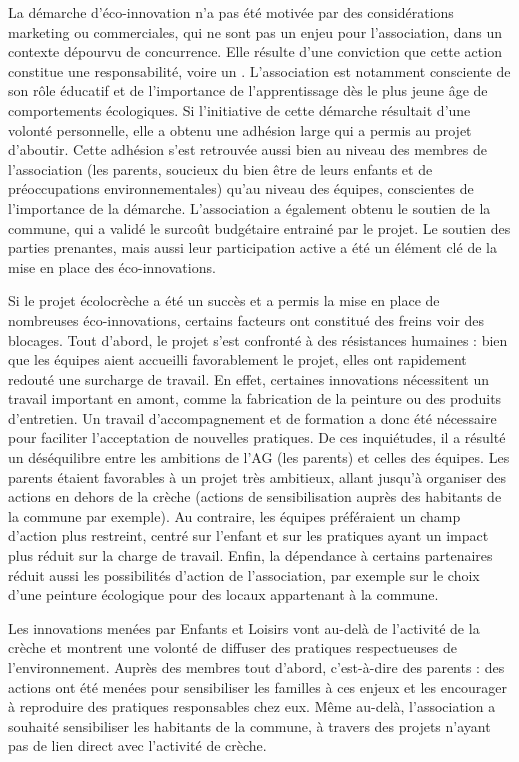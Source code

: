        La démarche d’éco-innovation n’a pas été motivée par des considérations marketing ou commerciales, qui ne sont pas un enjeu pour l’association, dans un contexte dépourvu de concurrence. Elle résulte d’une conviction que cette action constitue une responsabilité, voire un . L’association est notamment consciente de son rôle éducatif et de l’importance de l’apprentissage dès le plus jeune âge de comportements écologiques. Si l’initiative de cette démarche résultait d’une volonté personnelle, elle a obtenu une adhésion large qui a permis au projet d’aboutir. Cette adhésion s’est retrouvée aussi bien au niveau des membres de l’association (les parents, soucieux du bien être de leurs enfants et de préoccupations environnementales) qu’au niveau des équipes, conscientes de l’importance de la démarche. L’association a également obtenu le soutien de la commune, qui a validé le surcoût budgétaire entrainé par le projet. Le soutien des parties prenantes, mais aussi leur participation active a été un élément clé de la mise en place des éco-innovations.

         Si le projet écolocrèche a été un succès et a permis la mise en place de nombreuses éco-innovations, certains facteurs ont constitué des freins voir des blocages. Tout d’abord, le projet s’est confronté à des résistances humaines : bien que les équipes aient accueilli favorablement le projet, elles ont rapidement redouté une surcharge de travail. En effet, certaines innovations nécessitent un travail important en amont, comme la fabrication de la peinture ou des produits d’entretien. Un travail d’accompagnement et de formation a donc été nécessaire pour faciliter l’acceptation de nouvelles pratiques.  De ces inquiétudes, il a résulté un déséquilibre entre les ambitions de l’AG (les parents) et celles des équipes. Les parents étaient favorables à un projet très ambitieux, allant jusqu’à organiser des actions en dehors de la crèche (actions de sensibilisation auprès des habitants de la commune par exemple). Au contraire, les équipes préféraient un champ d’action plus restreint, centré sur l’enfant et sur les pratiques ayant un impact plus réduit sur la charge de travail. Enfin, la dépendance à certains partenaires réduit aussi les possibilités d’action de l’association, par exemple sur le choix d’une peinture écologique pour des locaux appartenant à la commune.

        Les innovations menées par Enfants et Loisirs vont au-delà de l’activité de la crèche et montrent une volonté de diffuser des pratiques respectueuses de l’environnement. Auprès des membres tout d’abord, c'est-à-dire des parents : des actions ont été menées pour sensibiliser les familles à ces enjeux et les encourager à reproduire des pratiques responsables chez eux. Même au-delà, l’association a souhaité sensibiliser les habitants de la commune, à travers des projets n’ayant pas de lien direct avec l’activité de crèche.

